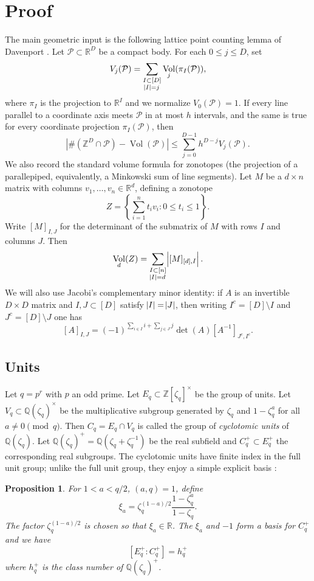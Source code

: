 \documentclass[10pt,a4paper]{amsart}
\newtheorem{prop}{Proposition}
\newcommand{\bQ}{\mathbb{Q}}
\newcommand{\bR}{\mathbb{R}}
\newcommand{\bZ}{\mathbb{Z}}
\DeclareMathOperator{\Vol}{Vol}
\def\cP{{\mathcal P}}
\begin{document}
\section{Proof}

The main geometric input is the following lattice point counting lemma of Davenport \cite{Davenport1951}. Let $\cP \subset \bR^D$ be a compact body. For each $0 \leq j \leq D$, set
\[
V_j(\cP) = \sum_{\substack{I \subset [D] \\ \abs{I} = j}} \Vol_j (\pi_I(\cP)),
\]
where $\pi_I$ is the projection to $\bR^I$ and we normalize $V_0(\cP)=1$. If every line parallel to a coordinate axis meets $\cP$ in at most $h$ intervals, and the same is true for every coordinate projection $\pi_I(\cP)$, then
\[
\left| \#(\bZ^D \cap \cP) - \operatorname{Vol}(\cP) \right|
\leq
\sum_{j=0}^{D-1} h^{D-j} V_j(\cP).
\]
We also record the standard volume formula for zonotopes (the projection of a parallepiped, equivalently, a Minkowski sum of line segments).  Let $M$ be a $d \times n$ matrix with columns $v_1,\dots,v_n \in \bR^d$, defining a zonotope
\[
Z=\left\{ \sum_{i=1}^n t_i v_i : 0 \leq t_i \leq 1 \right\}.
\]
Write $[M]_{I,J}$ for the determinant of the submatrix of $M$ with rows $I$ and columns $J$. Then
\[
\Vol_d(Z)
=
\sum_{\substack{I \subset [n] \\ \abs{I}=d}}
\abs{[M]_{[d],I}}.
\]
We will also use Jacobi's complementary minor identity: if $A$ is an invertible $D \times D$ matrix and $I,J \subset [D]$ satisfy $\abs{I}=\abs{J}$, then writing $I^c=[D] \setminus I$ and $J^c=[D] \setminus J$ one has
\[
[A]_{I,J}
=
(-1)^{\sum_{i \in I} i + \sum_{j \in J} j}
\det(A)[A^{-1}]_{J^c,I^c}.
\]


\subsection{Units}
Let $q=p^r$ with $p$ an odd prime. Let $E_q \subset \bZ[\zeta_q]^\times$ be the group of units. Let $V_q \subset \bQ(\zeta_q)^\times$ be the multiplicative subgroup generated by $\zeta_q$ and $1-\zeta_q^a$ for all $a \neq 0 \pmod q$. Then $C_q = E_q \cap V_q$ is called the group of \textit{cyclotomic units} of $\bQ(\zeta_q)$.
Let $\bQ(\zeta_q)^+ = \bQ(\zeta_q+\zeta_q^{-1})$ be the real subfield and $C^+_q \subset E^+_q$ the corresponding real subgroups. The cyclotomic units have finite index in the full unit group; unlike the full unit group, they enjoy a simple explicit basis \cite[Theorem 8.2]{Washington1997}:
\begin{prop}
For $1<a<q/2$, $(a,q)=1$, define
\[
\xi_a=\zeta_q^{(1-a)/2} \frac{1-\zeta_q^a}{1-\zeta_q}.
\]
The factor $\zeta_q^{(1-a)/2}$ is chosen so that $\xi_a \in \bR$. The $\xi_a$ and $-1$ form a basis for $C^+_q$ and we have
\[
\left[E_q^+:C_q^+ \right]=h_q^+
\]
where $h_q^+$ is the class number of $\bQ(\zeta_q)^+$.
\end{prop}
\end{document}
